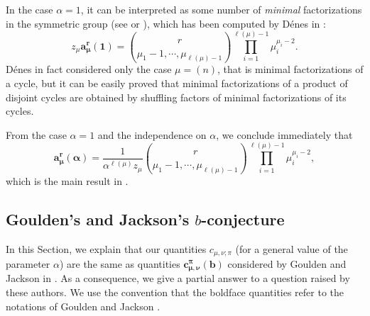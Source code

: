\documentclass[11pt]{amsart}
\theoremstyle{plain}
\theoremstyle{remark}
\begin{document}
In the case $\alpha=1$, it can be interpreted as some number of {\em minimal} factorizations
in the symmetric group (see \cite[Lemma 1]{VassilievaJack} or 
\cite[Proposition 3.1]{GouldenJacksonMatchingJack}),
which has been computed by Dénes in \cite{Denes1959}:
\[z_\mu \bm{a^r_\mu(1)} = \binom{r}{\mu_1-1,\cdots,\mu_{\ell(\mu)-1}} \prod_{i=1}^{\ell(\mu)-1} \mu_i^{\mu_i-2}.\]
Dénes in fact considered only the case $\mu=(n)$, that is minimal factorizations of a cycle,
but it can be easily proved that minimal factorizations of a product of disjoint cycles
are obtained by shuffling factors of minimal factorizations of its cycles.

From the case $\alpha=1$ and the independence on $\alpha$,
we conclude immediately that
\[\bm{a^r_\mu(\alpha)}
= \frac{1}{\alpha^{\ell(\mu)} z_\mu} \binom{r}{\mu_1-1,\cdots,\mu_{\ell(\mu)-1}}
\prod_{i=1}^{\ell(\mu)-1} \mu_i^{\mu_i-2},\]
which is the main result in \cite{VassilievaJack}.

\subsection{Goulden's and Jackson's $b$-conjecture}
\label{sect:b-conj}
In this Section, we explain that our quantities 
$c_{\mu,\nu;\pi}$ (for a general value of the parameter $\alpha$)
are the same as quantities $\bm{c_{\mu,\nu}^\pi(b)}$
considered by Goulden and Jackson in \cite{GouldenJacksonMatchingJack}.
As a consequence, we give a partial answer to a question
raised by these authors.
We use the convention that the boldface quantities
refer to the notations of Goulden and Jackson \cite{GouldenJacksonMatchingJack}.
\end{document}
